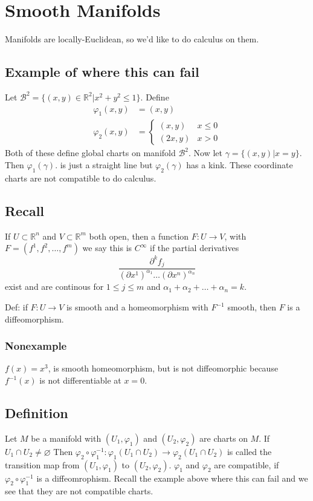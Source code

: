 \documentclass[a4paper]{article}
\begin{document}
\section*{Smooth Manifolds}
Manifolds are locally-Euclidean, so we'd like to do calculus on them.  

\subsection*{Example of where this can fail}
Let $\mathcal{B}^2 = \{(x,y) \in \mathds{R}^2 | x^2 + y^2 \leq 1 \}$. Define 
\[
    \begin{aligned}
        \varphi_1(x,y) &= (x,y) \\
        \varphi_2(x,y) &= 
    \begin{cases}
        (x,y) & x \leq 0 \\
        (2x, y) & x > 0
    \end{cases}
    \end{aligned}
\]
Both of these define global charts on manifold $\mathcal{B}^2$. Now let $\gamma = \{(x,y) | x=y\}$. Then $\varphi_1(\gamma)$. is just a straight line but $\varphi_2(\gamma)$ has a kink. These coordinate charts are not compatible to do calculus.

\subsection*{Recall}
If $U \subset \mathds{R}^n$ and $V \subset \mathds{R}^m$ both open, then a function $F: U \rightarrow V$, with $F = (f^1, f^2, \dots, f^m)$ we say this is $C^{\infty}$ if the partial derivatives
\[
    \frac{\partial^kf_j}{(\partial x^1)^{\alpha_1}\dots(\partial x^n)^{\alpha_n}}
\]
exist and are continous for $1 \leq j \leq m$ and $\alpha_1 + \alpha_2 + \dots + \alpha_n = k$.

Def: if $F: U \rightarrow V$ is smooth and a homeomorphism with $F^{-1}$ smooth, then $F$ is a diffeomorphism.

\subsubsection*{Nonexample}
$f(x) = x^3$, is smooth homeomorphism, but is not diffeomorphic because $f^{-1}(x)$ is not differentiable at $x=0$.

\subsection*{Definition} Let $M$ be a manifold with $(U_1, \varphi_1)$ and $(U_2, \varphi_2)$ are charts on $M$. If $U_1 \cap U_2 \neq \varnothing$  Then $\varphi_2 \circ \varphi_1^{-1}: \varphi_1(U_1 \cap U_2) \rightarrow \varphi_2(U_1 \cap U_2)$ is called the transition map from $(U_1, \varphi_1)$ to $(U_2, \varphi_2)$. $\varphi_1$ and $\varphi_2$ are compatible, if $\varphi_2 \circ \varphi_1^{-1}$ is a diffeomrophism. Recall the example above where this can fail and we see that they are not compatible charts.
\end{document}
